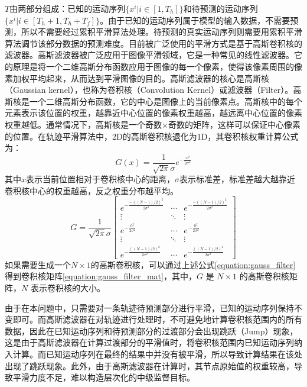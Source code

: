 $T$由两部分组成：已知的运动序列$\{x^i|i\in[1,T_h]\}$和待预测的运动序列$\{x^i|i\in[T_h+1,T_h+T_f]\}$。由于已知的运动序列属于模型的输入数据，不需要预测，所以不需要经过累积平滑算法处理。待预测的真实运动序列则需要用累积平滑算法调节该部分数据的预测难度。目前被广泛使用的平滑方式是基于高斯卷积核的滤波器。高斯滤波器被广泛应用于图像平滑领域，它是一种常见的线性滤波器。它的原理是将一个二维高斯分布函数应用于图像的每一个像素，使得该像素周围的像素加权平均起来，从而达到平滑图像的目的。高斯滤波器的核心是高斯核（Gaussian kernel），也称为卷积核（Convolution Kernel）或滤波器（Filter）。高斯核是一个二维高斯分布函数，它的中心是图像上的当前像素点。高斯核中的每个元素表示该位置的权重，越靠近中心位置的像素权重越高，越远离中心位置的像素权重越低。通常情况下，高斯核是一个奇数×奇数的矩阵，这样可以保证中心像素的位置。在轨迹平滑算法中，2D的高斯卷积核退化为1D，其卷积核权重计算公式为：
\begin{equation}
    G(x) = \frac{1}{\sqrt{2\pi}\sigma}e^{-\frac{x^2}{2\sigma^2}}
    \label{equation:gauss_filter}
\end{equation}
其中$x$表示当前位置相对于卷积核中心的距离，$\sigma$表示标准差，标准差越大越靠近卷积核中心的权重越高，反之权重分布越平均。
\begin{equation}
    G = \frac{1}{\sqrt{2\pi}\sigma}
        \begin{bmatrix}e^{-\frac{-{((N-1)/2)} ^2}{2\sigma^2}} & \cdots & e^{-\frac{-{((N-1)/2)}^2}{2\sigma^2}} \\ 
        \vdots & \ddots & \vdots \\
        e^{-\frac{0^2}{2\sigma^2}} & \cdots & e^{-\frac{0^2}{2\sigma^2}} \\
        \vdots & \ddots & \vdots \\
        e^{-\frac{{((N-1)/2)}^2}{2\sigma^2}} & \cdots & e^{-\frac{{((N-1)/2)}^2}{2\sigma^2}
        }\end{bmatrix}
    \label{equation:gauss_filter_mat}
\end{equation}
如果需要生成一个$N\times 1$的高斯卷积核，可以通过上述公式\ref{equation:gauss_filter}得到卷积核矩阵\ref{equation:gauss_filter_mat}，其中，$G$ 是 $N\times 1$ 的高斯卷积核矩阵，$N$ 表示卷积核的大小。

由于在本问题中，只需要对一条轨迹待预测部分进行平滑，已知的运动序列保持不变即可。而高斯滤波器在对轨迹进行处理时，不可避免地计算卷积核范围内的所有数据，因此在已知运动序列和待预测部分的过渡部分会出现跳跃（Jump）现象，这是由于高斯滤波器在计算过渡部分的平滑值时，将卷积核范围内已知运动序列纳入计算。而已知运动序列在最终的结果中并没有被平滑，所以导致计算结果在该处出现了跳跃现象。此外，由于高斯滤波器在计算时，其节点原始值的权重较高，导致平滑力度不足，难以构造层次化的中级监督目标。

